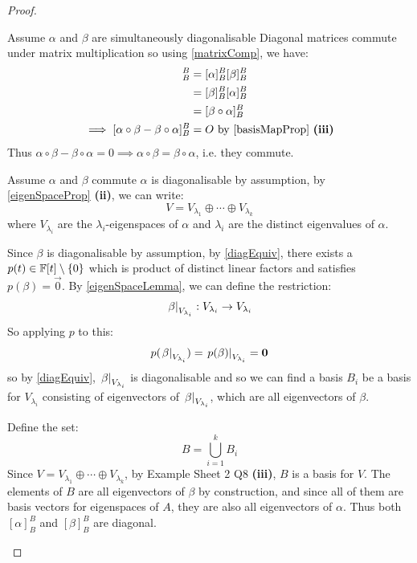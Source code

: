 \documentclass[../main.tex]{subfiles}
\begin{document}
\begin{proof}
  \begin{proofdirection}{Assume $\alpha$ and $\beta$ are simultaneously diagonalisable}
    Diagonal matrices commute under matrix multiplication so using \cref{matrixComp}, we have:
    \begin{align*}
      [\alpha \circ \beta]^{B}_{B} &= [\alpha]^{B}_{B} [\beta]^{B}_{B} \\
                                   &= [\beta]^{B}_{B} [\alpha]^{B}_{B} \\
                                   &= [\beta \circ \alpha]^{B}_{B} \\
      \implies [\alpha \circ \beta - \beta \circ \alpha]^{B}_{B} &= O \text{ by \cref{basisMapProp} \textbf{(iii)}}
    \end{align*}
    Thus $\alpha \circ \beta - \beta \circ \alpha = 0 \implies \alpha \circ \beta = \beta \circ \alpha$, i.e. they commute.
  \end{proofdirection}
  \begin{proofdirection}{Assume $\alpha$ and $\beta$ commute}
    $\alpha$ is diagonalisable by assumption, by \cref{eigenSpaceProp} \textbf{(ii)}, we can write:
    \[
      V = V_{\lambda_1} \oplus \cdots \oplus V_{\lambda_k}
    \]
    where $V_{\lambda_i}$ are the $\lambda_i$-eigenspaces of $\alpha$ and $\lambda_i$ are the distinct eigenvalues of $\alpha$.

    Since $\beta$ is diagonalisable by assumption, by \cref{diagEquiv}, there exists a $p(t) \in \mathbb{F}[t] \setminus \{0\}$ which is product of distinct linear factors and satisfies $p(\beta) = \vec{0}$.
    By \cref{eigenSpaceLemma}, we can define the restriction:
    \[
      \left. \beta \right|_{V_{\lambda_i}}: V_{\lambda_i} \to V_{\lambda_i}
    \]
    So applying $p$ to this:
    \[
      p(\left. \beta \right|_{V_{\lambda_i}}) = \left. p(\beta) \right|_{V_{\lambda_i}} = \mathbf{\bm{0}}
    \]
    so by \cref{diagEquiv}, $\left. \beta \right|_{V_{\lambda_i}}$ is diagonalisable and so we can find a basis $B_i$ be a basis for $V_{\lambda_i}$ consisting of eigenvectors of $\left. \beta \right|_{V_{\lambda_i}}$, which are all eigenvectors of $\beta$.

    Define the set:
    \[
      B = \bigcup_{i = 1}^{k} B_i
    \]
    Since $V = V_{\lambda_1} \oplus \cdots \oplus V_{\lambda_k}$, by Example Sheet 2 Q8 \textbf{(iii)}, $B$ is a basis for $V$.
    The elements of $B$ are all eigenvectors of $\beta$ by construction, and since all of them are basis vectors for eigenspaces of $A$, they are also all eigenvectors of $\alpha$.
    Thus both $[\alpha]^{B}_{B}$ and $[\beta]^{B}_{B}$ are diagonal.
  \end{proofdirection}
\end{proof}
\end{document}
